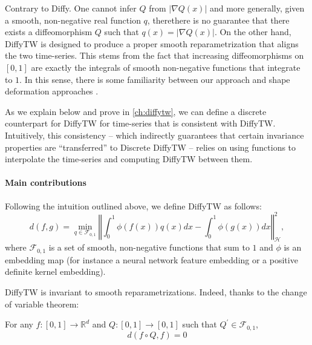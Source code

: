 Contrary to Diffy.
One cannot infer $Q$ from $\vert \nabla Q(x)\vert$ and more generally, given a smooth, non-negative real function $q$, therethere is no guarantee that there exists a diffeomorphism $Q$ such that $q(x) = \vert \nabla Q(x) \vert$. On the other hand, DiffyTW is designed to produce a proper smooth reparametrization that aligns the two time-series. This stems from the fact that increasing diffeomorphisms on $[0,1]$ are exactly the integrals of smooth non-negative functions that integrate to $1$. In this sense, there is some familiarity between our approach and shape deformation approaches \cite{younes}.

As we explain below and prove in \cref{ch:diffytw}, we can define a discrete counterpart for DiffyTW for time-series that is consistent with DiffyTW. Intuitively, this consistency -- which indirectly guarantees that certain invariance properties are ``transferred'' to Discrete DiffyTW -- relies on using functions to interpolate the time-series and computing DiffyTW between them.

\paragraph{Main contributions}Following the intuition outlined above, we define DiffyTW as follows:
\begin{equation*}
d(f, g) = \min_{q \in \mathcal F_{0,1}}\left\Vert \int_0^1 \phi(f(x))q(x)dx - \int_0^1\phi(g(x))dx\right\Vert^2_\mathcal H,
\end{equation*}
where $\mathcal F_{0,1}$ is a set of smooth, non-negative functions that sum to $1$ and $\phi$ is an embedding map (for instance a neural network feature embedding or a positive definite kernel embedding).

DiffyTW is invariant to smooth reparametrizations. Indeed, thanks to the change of variable theorem:
\begin{mdframed}
\begin{informaltheorem}
For any $f:[0,1] \to\mathbb R^d$ and $Q:[0,1]\to[0,1]$ such that $Q^\prime \in\mathcal F_{0,1}$,
\begin{equation*}
d(f\circ Q, f) = 0
\end{equation*}
\end{informaltheorem}
\end{mdframed}

